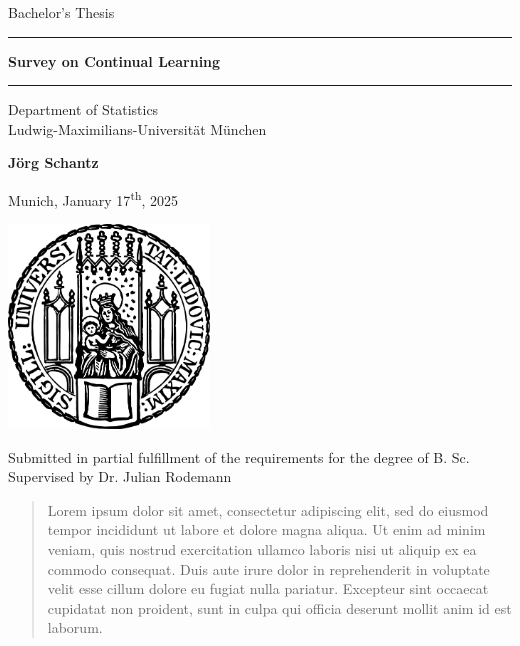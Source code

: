 \documentclass[12pt]{article}
\newcommand{\mytitle}{Survey on Continual Learning}
\newcommand{\myname}{Jörg Schantz}
\newcommand{\mysupervisor}{Dr. Julian Rodemann}
\begin{document}
	
	
	\begin{titlepage}
		\begin{center}
			
			\LARGE
			Bachelor's Thesis
			
			\vspace{0.5cm}
			
			\rule{\textwidth}{1.5pt}
			\LARGE
			\textbf{\mytitle}
			\rule{\textwidth}{1.5pt}
			
			\vspace{0.5cm}
			
			\large
			Department of Statistics \\
			Ludwig-Maximilians-Universität München 
			
			\vfill
			
			\Large
			\textbf{\myname}
			
			\vfill
			
			\large
			Munich, January 17\textsuperscript{th}, 2025
			
			\vfill
			
			\includegraphics[width = 0.4\textwidth]{img/sigillum.png}
			
			\vfill
			
			\normalsize
			Submitted in partial fulfillment of the requirements for the degree of B. Sc.
			\\
			
			Supervised by \mysupervisor
			
		\end{center}
	\end{titlepage}
	
	
	\newpage
	
	\begin{abstract}
		
		Lorem ipsum dolor sit amet, consectetur adipiscing elit, sed do eiusmod tempor 
		incididunt ut labore et dolore magna aliqua. Ut enim ad minim veniam, quis 
		nostrud exercitation ullamco laboris nisi ut aliquip ex ea commodo consequat. 
		Duis aute irure dolor in reprehenderit in voluptate velit esse cillum dolore eu 
		fugiat nulla pariatur. Excepteur sint occaecat cupidatat non proident, sunt in 
		culpa qui officia deserunt mollit anim id est laborum. \cite{SB}
		
	\end{abstract}
	
\end{document}
